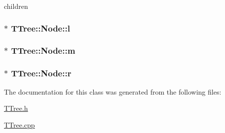 children 

\hypertarget{classTTree_1_1Node_a78f1bf067928d0e0106e1187364cc69e}{}
\subsubsection[{l}]{$\ast$ T\+Tree\+::\+Node\+::l}\label{classTTree_1_1Node_a78f1bf067928d0e0106e1187364cc69e}
\hypertarget{classTTree_1_1Node_a3f47f1068b4631b1d9eddea0300c6bee}{}
\subsubsection[{m}]{ $\ast$ T\+Tree\+::\+Node\+::m}\label{classTTree_1_1Node_a3f47f1068b4631b1d9eddea0300c6bee}
\hypertarget{classTTree_1_1Node_adb67ed846e6787b3ff26bbcee11ee4b6}{}
\subsubsection[{r}]{ $\ast$ T\+Tree\+::\+Node\+::r}\label{classTTree_1_1Node_adb67ed846e6787b3ff26bbcee11ee4b6}


The documentation for this class was generated from the following files\+:\begin{DoxyCompactItemize}
\item 
\hyperlink{TTree_8h}{T\+Tree.\+h}\item 
\hyperlink{TTree_8cpp}{T\+Tree.\+cpp}\end{DoxyCompactItemize}
